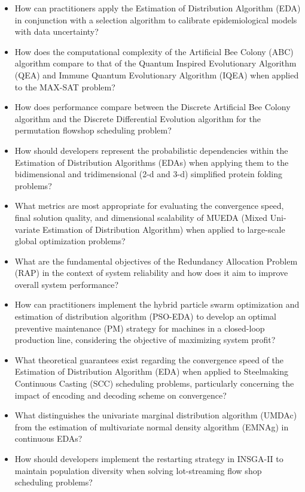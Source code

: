 \begin{itemize}[noitemsep]
    \item How can practitioners apply the Estimation of Distribution Algorithm (EDA) in conjunction with a selection algorithm to calibrate epidemiological models with data uncertainty?
    \item How does the computational complexity of the Artificial Bee Colony (ABC) algorithm compare to that of the Quantum Inspired Evolutionary Algorithm (QEA) and Immune Quantum Evolutionary Algorithm (IQEA) when applied to the MAX-SAT problem?
    \item How does performance compare between the Discrete Artificial Bee Colony algorithm and the Discrete Differential Evolution algorithm for the permutation flowshop scheduling problem?
    \item How should developers represent the probabilistic dependencies within the Estimation of Distribution Algorithms (EDAs) when applying them to the bidimensional and tridimensional (2-d and 3-d) simplified protein folding problems?
    \item What metrics are most appropriate for evaluating the convergence speed, final solution quality, and dimensional scalability of MUEDA (Mixed Uni-variate Estimation of Distribution Algorithm) when applied to large-scale global optimization problems?
    \item What are the fundamental objectives of the Redundancy Allocation Problem (RAP) in the context of system reliability and how does it aim to improve overall system performance?
    \item How can practitioners implement the hybrid particle swarm optimization and estimation of distribution algorithm (PSO-EDA) to develop an optimal preventive maintenance (PM) strategy for machines in a closed-loop production line, considering the objective of maximizing system profit?
    \item What theoretical guarantees exist regarding the convergence speed of the Estimation of Distribution Algorithm (EDA) when applied to Steelmaking Continuous Casting (SCC) scheduling problems, particularly concerning the impact of encoding and decoding scheme on convergence?
    \item What distinguishes the univariate marginal distribution algorithm (UMDAc) from the estimation of multivariate normal density algorithm (EMNAg) in continuous EDAs?
    \item How should developers implement the restarting strategy in INSGA-II to maintain population diversity when solving lot-streaming flow shop scheduling problems?

\end{itemize}
